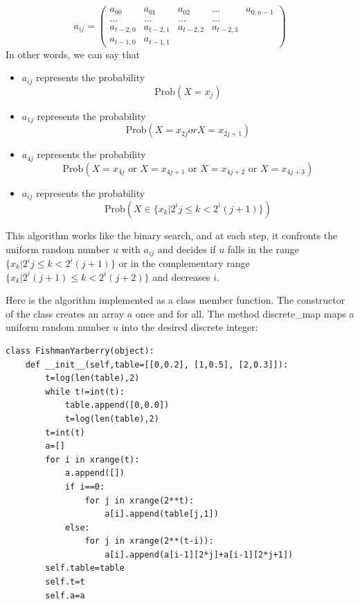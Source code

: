 \documentclass[justified,sixbynine]{tufte-book}
\theoremstyle{plain}%
\theoremstyle{definition}
\theoremstyle{remark}
\begin{document}
\begin{fullwidth}
\begin{equation}
a_{ij}=\left(
\begin{array}{lllll}
a_{00} & a_{01} & a_{02} & \dots & a_{0,n-1} \\
\dots & \dots & \dots & \dots &  \\
a_{t-2,0} & a_{t-2,1} & a_{t-2,2} & a_{t-2,3} &  \\
a_{t-1,0} & a_{t-1,1} &  &  &
\end{array}
\right)
\end{equation}
In other words, we can say that

\begin{itemize}
\item  $a_{ij}$ represents the probability
\begin{equation}
\textrm{Prob}(X=x_j)
\end{equation}

\item  $a_{1j}$ represents the probability
\begin{equation}
\textrm{Prob}(X=x_{2j}orX=x_{2j+1})
\end{equation}

\item  $a_{4j}$ represents the probability
\begin{equation}
\textrm{Prob}(X=x_{4j}\text{ or }X=x_{4j+1}\text{ or }X=x_{4j+2}\text{ or }X=x_{4j+3})
\end{equation}

\item  $a_{ij}$ represents the probability
\begin{equation}
\textrm{Prob}(X\in \{x_k|2^ij\leq k<2^i(j+1)\})
\end{equation}
\end{itemize}

This algorithm works like the binary search, and at each step, it confronts the
uniform random number $u$ with $a_{ij}$ and decides if $u$ falls in the
range $\{x_k|2^ij\leq k<2^i(j+1)\}$ or in the complementary range $%
\{x_k|2^i(j+1)\leq k<2^i(j+2)\}$ and decreases $i.$

Here is the algorithm implemented as a class member function. The
constructor of the class creates an array $a$ once and for all. The method
discrete\_map maps a uniform random number $u$ into the desired discrete
integer:


\begin{lstlisting}
class FishmanYarberry(object):
    def __init__(self,table=[[0,0.2], [1,0.5], [2,0.3]]):
        t=log(len(table),2)
        while t!=int(t):
            table.append([0,0.0])
            t=log(len(table),2)
        t=int(t)
        a=[]
        for i in xrange(t):
            a.append([])
            if i==0:
                for j in xrange(2**t):
                    a[i].append(table[j,1])
            else:
                for j in xrange(2**(t-i)):
                    a[i].append(a[i-1][2*j]+a[i-1][2*j+1])
        self.table=table
        self.t=t
        self.a=a


\end{lstlisting}
\end{fullwidth}
\end{document}
